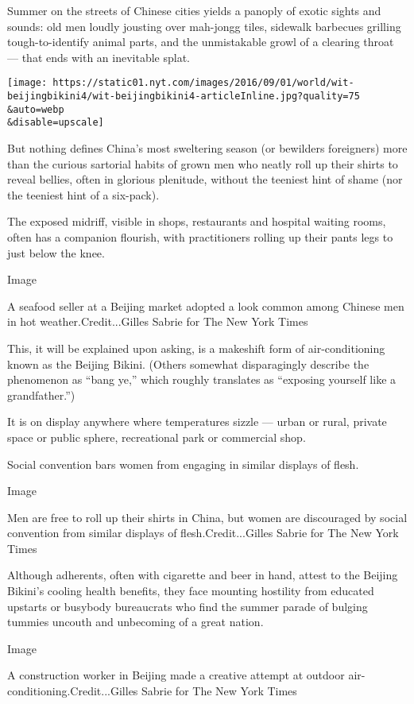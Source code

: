 Summer on the streets of Chinese cities yields a panoply of exotic
sights and sounds: old men loudly jousting over mah-jongg tiles,
sidewalk barbecues grilling tough-to-identify animal parts, and the
unmistakable growl of a clearing throat --- that ends with an inevitable
splat.

\texttt{[image: https://static01.nyt.com/images/2016/09/01/world/wit-beijingbikini4/wit-beijingbikini4-articleInline.jpg?quality=75\\\&auto=webp\\\&disable=upscale]}

But nothing defines China's most sweltering season (or bewilders
foreigners) more than the curious sartorial habits of grown men who
neatly roll up their shirts to reveal bellies, often in glorious
plenitude, without the teeniest hint of shame (nor the teeniest hint of
a six-pack).

The exposed midriff, visible in shops, restaurants and hospital waiting
rooms, often has a companion flourish, with practitioners rolling up
their pants legs to just below the knee.

Image

A seafood seller at a Beijing market adopted a look common among Chinese
men in hot weather.Credit...Gilles Sabrie for The New York Times

This, it will be explained upon asking, is a makeshift form of
air-conditioning known as the Beijing Bikini. (Others somewhat
disparagingly describe the phenomenon as ``bang ye,'' which roughly
translates as ``exposing yourself like a grandfather.'')

It is on display anywhere where temperatures sizzle --- urban or rural,
private space or public sphere, recreational park or commercial shop.

Social convention bars women from engaging in similar displays of flesh.

Image

Men are free to roll up their shirts in China, but women are discouraged
by social convention from similar displays of flesh.Credit...Gilles
Sabrie for The New York Times

Although adherents, often with cigarette and beer in hand, attest to the
Beijing Bikini's cooling health benefits, they face mounting hostility
from educated upstarts or busybody bureaucrats who find the summer
parade of bulging tummies uncouth and unbecoming of a great nation.

Image

A construction worker in Beijing made a creative attempt at outdoor
air-conditioning.Credit...Gilles Sabrie for The New York Times

